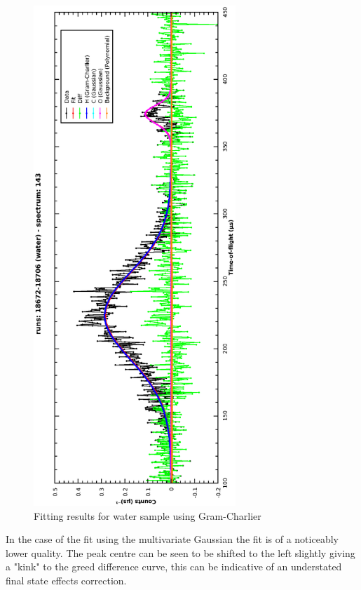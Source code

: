 \documentclass[a4paper]{article}
\begin{document}
\begin{figure}[h!]
  \centering
  \vspace{-60pt}
  \begin{turn}{-90}
    \includegraphics[width=0.68\textwidth]{graphics/cs_water_gc.eps}
  \end{turn}
  \vspace{-60pt}
  \caption{Fitting results for water sample using Gram-Charlier}
  \label{fig:gc_water_fit}
\end{figure}
\FloatBarrier

In the case of the fit using the multivariate Gaussian the fit is of a
noticeably lower quality. The peak centre can be seen to be shifted to the left
slightly giving a "kink" to the greed difference curve, this can be indicative
of an understated final state effects correction.
\end{document}
